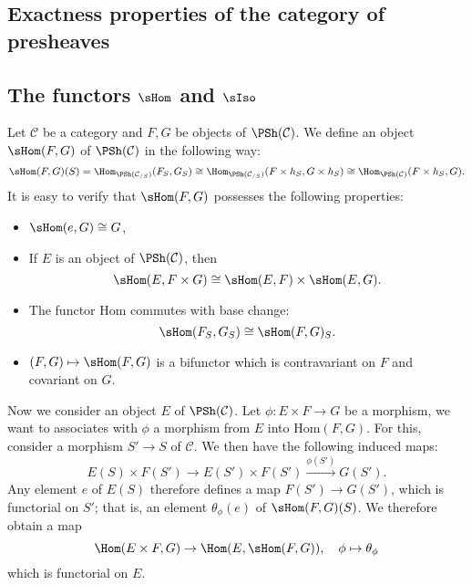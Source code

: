 \subsection{Exactness properties of the category of presheaves}
\subsection{The functors \texorpdfstring{$\sHom$}{Hom} and \texorpdfstring{$\sIso$}{Iso}}
Let $\mathcal{C}$ be a category and $F,G$ be objects of $\PSh(\mathcal{C})$. We define an object $\sHom(F,G)$ of $\PSh(\mathcal{C})$ in the following way:
\[\sHom(F,G)(S)=\Hom_{\PSh(\mathcal{C}_{/S})}(F_S,G_S)\cong\Hom_{\PSh(\mathcal{C}_{/S})}(F\times h_S,G\times h_S)\cong\Hom_{\PSh(\mathcal{C})}(F\times h_S,G).\]
It is easy to verify that $\sHom(F,G)$ possesses the following properties:
\begin{itemize}
    \item $\sHom(e,G)\cong G$,
    \item If $E$ is an object of $\PSh(\mathcal{C})$, then
    \begin{equation}\label{category presheaf Hom functor prop-1}
    \sHom(E,F\times G)\cong \sHom(E,F)\times \sHom(E,G).
    \end{equation}
    \item The functor $\mathrm{Hom}$ commutes with base change:
    \begin{equation}\label{category presheaf Hom functor prop-2}
    \sHom(F_S,G_S)\cong \sHom(F,G)_S.
    \end{equation}
    \item $(F,G)\mapsto\sHom(F,G)$ is a bifunctor which is contravariant on $F$ and covariant on $G$.
\end{itemize}

Now we consider an object $E$ of $\PSh(\mathcal{C})$. Let $\phi:E\times F\to G$ be a morphism, we want to associates with $\phi$ a morphism from $E$ into $\mathrm{Hom}(F,G)$. For this, consider a morphism $S'\to S$ of $\mathcal{C}$. We then have the following induced maps:
\[E(S)\times F(S')\to E(S')\times F(S')\stackrel{\phi(S')}{\longrightarrow}G(S').\]
Any element $e$ of $E(S)$ therefore defines a map $F(S')\to G(S')$, which is functorial on $S'$; that is, an element $\theta_\phi(e)$ of $\sHom(F,G)(S)$. We therefore obtain a map
\[\Hom(E\times F,G)\to \Hom(E,\sHom(F,G)),\quad \phi\mapsto\theta_\phi\]
which is functorial on $E$.

